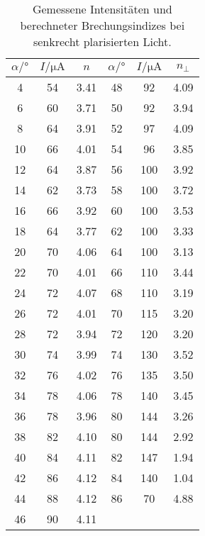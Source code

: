 \begin{table}[H]
  \centering
  \caption{Gemessene Intensitäten und berechneter Brechungsindizes bei senkrecht plarisierten Licht.}
  \label{tab:senk}
  \begin{tabular}{c c c c c c}
    \toprule
    $\alpha /°$ & $I / \unit{\micro\ampere}$ & $n$ & $\alpha /°$ & $I / \unit{\micro\ampere}$ & $n_\perp$\\
    \midrule          
    4  &  54  & 3.41    & 48 &  92   & 4.09   \\
    6  &  60  & 3.71    & 50 &  92   & 3.94   \\ 
    8  &  64  & 3.91    & 52 &  97   & 4.09    \\
    10 &  66  & 4.01    & 54 &  96   & 3.85    \\
    12 &  64  & 3.87    & 56 &  100  & 3.92    \\
    14 &  62  & 3.73    & 58 &  100  & 3.72    \\
    16 &  66  & 3.92    & 60 &  100  & 3.53    \\
    18 &  64  & 3.77    & 62 &  100  & 3.33   \\ 
    20 &  70  & 4.06    & 64 &  100  & 3.13    \\
    22 &  70  & 4.01    & 66 &  110  & 3.44    \\
    24 &  72  & 4.07    & 68 &  110  & 3.19    \\
    26 &  72  & 4.01    & 70 &  115  & 3.20    \\
    28 &  72  & 3.94    & 72 &  120  & 3.20    \\
    30 &  74  & 3.99    & 74 &  130  & 3.52    \\
    32 &  76  & 4.02    & 76 &  135  & 3.50   \\ 
    34 &  78  & 4.06    & 78 &  140  & 3.45   \\
    36 &  78  & 3.96    & 80 &  144  & 3.26   \\
    38 &  82  & 4.10    & 80 &  144  & 2.92   \\
    40 &  84  & 4.11    & 82 &  147  & 1.94   \\
    42 &  86  & 4.12    & 84 &  140  & 1.04   \\
    44 &  88  & 4.12    & 86 &  70   & 4.88 \\ 
    46 &  90  & 4.11    &    &       &        \\                 
    \bottomrule
  \end{tabular}
\end{table}
      
